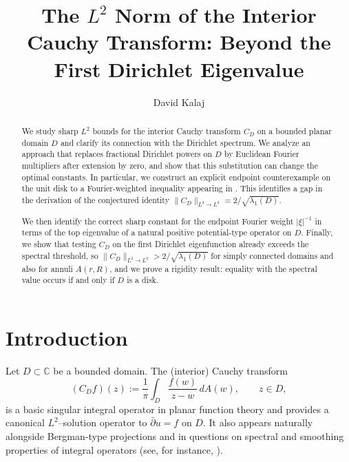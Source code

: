 \documentclass{amsart}
\title{The $L^2$ Norm of the Interior Cauchy Transform: Beyond the First Dirichlet Eigenvalue}
\author{David Kalaj}
\date{}
\newcommand{\C}{\mathbb{C}}
\theoremstyle{plain}
\theoremstyle{remark}
\begin{document}
\begin{abstract}
We study sharp \(L^2\) bounds for the interior Cauchy transform \(C_D\) on a bounded planar domain \(D\) and clarify its connection with the Dirichlet spectrum. We analyze an approach that replaces fractional Dirichlet powers on \(D\) by Euclidean Fourier multipliers after extension by zero, and show that this substitution can change the optimal constants. In particular, we construct an explicit endpoint counterexample on the unit disk to a Fourier-weighted inequality appearing in \cite{Dostanic1996}. This identifies a gap in the derivation of the conjectured identity \(\|C_D\|_{L^2\to L^2}=2/\sqrt{\lambda_1(D)}\).

We then identify the correct sharp constant for the endpoint Fourier weight $|\xi|^{-1}$ in terms of the top eigenvalue of a natural positive potential-type operator on $D$. Finally, we show that testing $C_D$ on the first Dirichlet eigenfunction already exceeds the spectral threshold, so $\|C_D\|_{L^2\to L^2}>2/\sqrt{\lambda_1(D)}$ for simply connected domains and also for annuli $A(r,R)$, and we prove a rigidity result: equality with the spectral value occurs if and only if $D$ is a disk.
\end{abstract}

\maketitle











\section{Introduction}\label{sec:introduction}

Let $D\subset\C$ be a bounded domain. The (interior) Cauchy transform
\begin{equation}\label{eq:intro-cauchy}
(C_D f)(z):=\frac{1}{\pi}\int_D \frac{f(w)}{z-w}\,dA(w),\qquad z\in D,
\end{equation}
is a basic singular integral operator in planar function theory and provides a
canonical $L^2$--solution operator to $\bar\partial u=f$ on $D$. It also appears
naturally alongside Bergman-type projections and in questions on spectral and
smoothing properties of integral operators (see, for instance,
\cite{AndersonKhavinsonLomonosov1992,Dostanic1996,Kalaj2012AIM,ZhuKalaj2020}).
\end{document}
